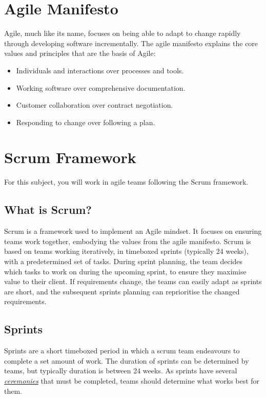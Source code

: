 \documentclass[letterpaper,10pt,english]{jupyterBook}
\begin{document}
\section{Agile Manifesto}
\label{\detokenize{chapter_1/agile_methodology:agile-manifesto}}
\sphinxAtStartPar
Agile, much like its name, focuses on being able to adapt to change
rapidly through developing software incrementally. The agile manifesto
explains the core values and principles that are the basis of Agile:
\begin{itemize}
\item {} 
\sphinxAtStartPar
Individuals and interactions over processes and tools.

\item {} 
\sphinxAtStartPar
Working software over comprehensive documentation.

\item {} 
\sphinxAtStartPar
Customer collaboration over contract negotiation.

\item {} 
\sphinxAtStartPar
Responding to change over following a plan.

\end{itemize}


\section{Scrum Framework}
\label{\detokenize{chapter_1/agile_methodology:scrum-framework}}
\sphinxAtStartPar
For this subject, you will work in agile teams following the Scrum
framework.


\subsection{What is Scrum?}
\label{\detokenize{chapter_1/agile_methodology:what-is-scrum}}
\sphinxAtStartPar
Scrum is a framework used to implement an Agile mindset. It focuses on ensuring teams
work together, embodying the values from the agile manifesto. Scrum is based on teams
working iteratively, in time\sphinxhyphen{}boxed sprints (typically 2\sphinxhyphen{}4 weeks), with a predetermined
set of tasks. During sprint planning, the team decides which tasks to work on during
the upcoming sprint, to ensure they maximise value to their client. If requirements
change, the teams can easily adapt as sprints are short, and the subsequent sprints
planning can re\sphinxhyphen{}prioritise the changed requirements.


\subsection{Sprints}
\label{\detokenize{chapter_1/agile_methodology:sprints}}
\sphinxAtStartPar
Sprints are a short time\sphinxhyphen{}boxed period in which a scrum team endeavours to complete a set
amount of work. The duration of sprints can be determined by teams, but typically duration
is between 2\sphinxhyphen{}4 weeks. As sprints have several {\hyperref[\detokenize{chapter_1/agile_methodology:scrum-ceremonies}]{\emph{ceremonies}}} that must be
completed, teams should determine what works best for them.
\end{document}
